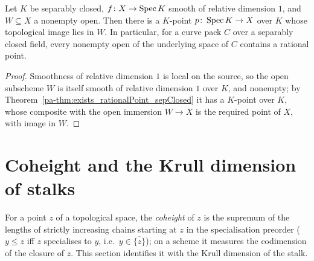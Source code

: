 \begin{theorem}
  \label{pa-thm:exists_rationalPoint_mem}
  \leanok

  Let \(K\) be separably closed, \(f \colon X \to \operatorname{Spec} K\) smooth of relative dimension
  \(1\), and \(W \subseteq X\) a nonempty open. Then there is a \(K\)-point
  \(p \colon \operatorname{Spec} K \to X\) over \(K\) whose topological image lies in \(W\). In
  particular, for a curve pack \(C\) over a separably closed field, every nonempty open of
  the underlying space of \(C\) contains a rational point.
\end{theorem}
\begin{proof}
  \leanok
  Smoothness of relative dimension \(1\) is local on the source, so the open subscheme
  \(W\) is itself smooth of relative dimension \(1\) over \(K\), and nonempty; by
  Theorem~\ref{pa-thm:exists_rationalPoint_sepClosed} it has a \(K\)-point over \(K\), whose
  composite with the open immersion \(W \to X\) is the required point of \(X\), with image
  in \(W\).
\end{proof}

\section{Coheight and the Krull dimension of stalks}
\label{pa-sec:coheight_stalk}

For a point \(z\) of a topological space, the \emph{coheight} of \(z\) is the supremum
of the lengths of strictly increasing chains starting at \(z\) in the specialisation
preorder (\(y \leq z\) iff \(z\) specialises to \(y\), i.e.\ \(y \in \overline{\{z\}}\));
on a scheme it measures the codimension of the closure of \(z\). This section identifies
it with the Krull dimension of the stalk.

